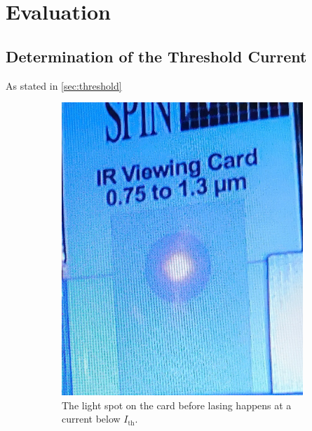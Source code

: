 \newpage
\section{Evaluation}
\label{sec:evaluation}
\subsection{Determination of the Threshold Current}
As stated in \ref{sec:threshold}
\begin{figure}[ht]
    \centering
    \begin{subfigure}{0.49\textwidth}
        \includegraphics[width=\textwidth]{bilder/laser_before.jpg}
        \caption{The light spot on the card before lasing happens at a current below $I_\text{th}$. \cite{anleitungHeNe}}
        \label{fig:laser_before}
    \end{subfigure}
    \hfill
    \begin{subfigure}{0.49\textwidth}

\end{subfigure}
\end{figure}
